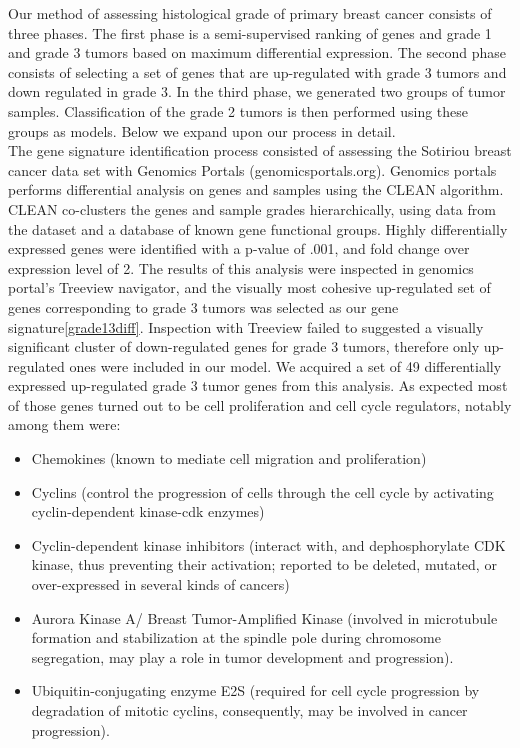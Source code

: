 \documentclass[a4paper,10pt]{article}
\begin{document}
Our method of assessing histological grade of primary breast cancer consists of three phases. The first phase is
a semi-supervised ranking of genes and grade 1 and grade 3 tumors based on maximum differential
expression. The second phase consists of selecting a set of genes that are up-regulated with 
grade 3 tumors and down regulated in grade 3. In the third phase, we generated two groups of tumor samples.
Classification of the grade 2 tumors is then performed using these groups as models. Below we expand upon
our process in detail.\\
The gene signature identification process consisted of assessing the Sotiriou breast cancer data set with Genomics Portals (genomicsportals.org).
Genomics portals performs differential analysis on genes and samples using the CLEAN algorithm\cite{CLEAN}. 
CLEAN co-clusters
the genes and sample grades hierarchically, using data from the dataset and a database of known gene functional groups. Highly differentially
expressed genes were identified with a p-value of .001, and fold change over expression level of 2. The results of this analysis
were inspected in genomics portal's Treeview navigator\cite{Treeview}, and the visually most cohesive up-regulated set of genes
corresponding to grade 3 tumors was selected as our gene signature\ref{grade13diff}. 
Inspection with Treeview failed to suggested a 
visually significant cluster of down-regulated genes for grade 3 tumors, therefore only up-regulated ones were included in our model. 
We acquired a set of 49 differentially expressed up-regulated grade 3 tumor genes from this analysis.
As expected most of those genes turned out to be cell proliferation and cell cycle regulators, notably among them were:
\begin{itemize}
\item Chemokines (known to mediate cell migration and proliferation)
\item Cyclins (control the progression of cells through the cell cycle by activating cyclin-dependent kinase-cdk enzymes)
\item Cyclin-dependent kinase inhibitors  (interact with, and dephosphorylate CDK kinase,  thus preventing their activation; reported to be deleted, mutated, or over-expressed in several kinds of cancers)
\item Aurora Kinase A/ Breast Tumor-Amplified Kinase (involved in microtubule formation and stabilization at the spindle pole during chromosome segregation, may play a role  in tumor development and progression).
\item Ubiquitin-conjugating enzyme E2S (required for cell cycle progression by degradation of mitotic cyclins, consequently, may be involved in cancer progression).
\end{itemize}
\end{document}
